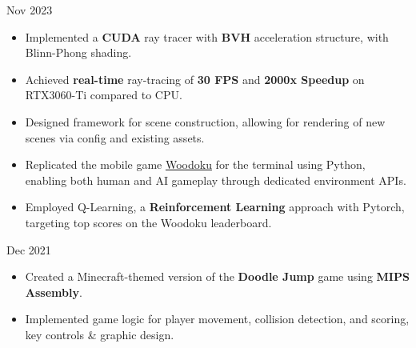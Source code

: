 \documentclass[10pt,a4paper,ragged2e,withhyper]{altacv}
\begin{document}
\begin{paracol}{2}

    {Nov 2023 
    }{}
    \begin{itemize}
        \item Implemented a \textbf{CUDA} ray tracer with \textbf{BVH} acceleration structure, with Blinn-Phong shading.
        \item Achieved \textbf{real-time} ray-tracing of \textbf{30 FPS} and \textbf{2000x Speedup} on RTX3060-Ti compared to CPU\@.
        \item Designed framework for scene construction, allowing for rendering
              of new scenes via config and existing assets. \end{itemize}


    \divider{}
    \begin{itemize}

        \item Replicated the mobile game \href{https://play.google.com/store/apps/details?id=com.tripledot.woodoku&hl=en_CA&gl=US}{Woodoku} for the terminal using Python, enabling both human and AI gameplay through dedicated environment APIs.
        \item Employed Q-Learning, a \textbf{Reinforcement Learning} approach with Pytorch, targeting top scores on the Woodoku leaderboard.

    \end{itemize}

    \divider{}
    {Dec 2021 }{}
    \begin{itemize}
        \item Created a Minecraft-themed version of the \textbf{Doodle Jump} game using \textbf{MIPS Assembly}.
        \item Implemented game logic for player movement, collision detection, and scoring, key controls \& graphic design.
    \end{itemize}
    

\end{paracol}
\end{document}
